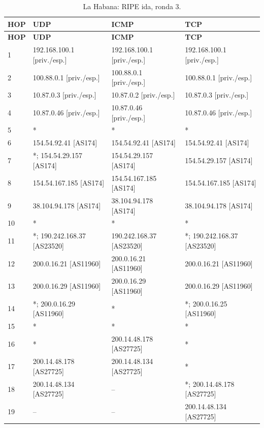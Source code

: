 \endgroup
\begingroup
\fontsize{9}{11}\selectfont
\begin{longtable}{p{0.95cm}p{4.716666666666667cm}p{4.716666666666667cm}p{4.716666666666667cm}}
\caption{La Habana: RIPE ida, ronda 3.}\label{anexo:ripe:200.14.48.134:3} \\
\toprule
\textbf{HOP} & \textbf{UDP} & \textbf{ICMP} & \textbf{TCP} \\ \midrule
\endfirsthead
\toprule
\textbf{HOP} & \textbf{UDP} & \textbf{ICMP} & \textbf{TCP} \\ \midrule
\endhead
1 & 192.168.100.1 [priv./esp.] & 192.168.100.1 [priv./esp.] & 192.168.100.1 [priv./esp.] \\
2 & 100.88.0.1 [priv./esp.] & 100.88.0.1 [priv./esp.] & 100.88.0.1 [priv./esp.] \\
3 & 10.87.0.3 [priv./esp.] & 10.87.0.2 [priv./esp.] & 10.87.0.3 [priv./esp.] \\
4 & 10.87.0.46 [priv./esp.] & 10.87.0.46 [priv./esp.] & 10.87.0.46 [priv./esp.] \\
5 & * & * & * \\
6 & 154.54.92.41 [AS174] & 154.54.92.41 [AS174] & 154.54.92.41 [AS174] \\
7 & *; 154.54.29.157 [AS174] & 154.54.29.157 [AS174] & 154.54.29.157 [AS174] \\
8 & 154.54.167.185 [AS174] & 154.54.167.185 [AS174] & 154.54.167.185 [AS174] \\
9 & 38.104.94.178 [AS174] & 38.104.94.178 [AS174] & 38.104.94.178 [AS174] \\
10 & * & * & * \\
11 & *; 190.242.168.37 [AS23520] & 190.242.168.37 [AS23520] & *; 190.242.168.37 [AS23520] \\
12 & 200.0.16.21 [AS11960] & 200.0.16.21 [AS11960] & 200.0.16.21 [AS11960] \\
13 & 200.0.16.29 [AS11960] & 200.0.16.29 [AS11960] & 200.0.16.29 [AS11960] \\
14 & *; 200.0.16.29 [AS11960] & * & *; 200.0.16.25 [AS11960] \\
15 & * & * & * \\
16 & * & 200.14.48.178 [AS27725] & * \\
17 & 200.14.48.178 [AS27725] & 200.14.48.134 [AS27725] & * \\
18 & 200.14.48.134 [AS27725] & -- & *; 200.14.48.178 [AS27725] \\
19 & -- & -- & 200.14.48.134 [AS27725] \\
\bottomrule
\end{longtable}
